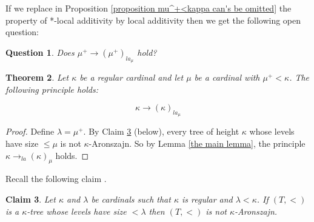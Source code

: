 \documentclass[11pt]{amsart}
\theoremstyle{plain}
\newtheorem{theorem}{Theorem}[section]
\newtheorem{claim}[theorem]{Claim}
\newtheorem{question}[theorem]{Question}
\theoremstyle{definition} %
\theoremstyle{remark}
\begin{document}
If we replace in Proposition \ref{proposition mu^+<kappa can's be omitted} the property of *-local additivity by local additivity then we get the following open question:
\begin{question}
Does $\mu^+ \rightarrow  (\mu^+)_{la_\mu}$ hold?
\end{question}


\begin{theorem}\label{the only theorem}
Let $\kappa$ be a regular cardinal and let $\mu$ be a cardinal with
 $\mu^+<\kappa$. The following principle holds:

 \[
 \kappa \rightarrow  (\kappa)_{la_\mu}
 \]


\end{theorem}

\begin{proof}
Define $\lambda=\mu^+$. By Claim \ref{the exercise of kunen} (below), every tree of height $\kappa$ whose levels have size $\leq \mu$ is not $\kappa$-Aronszajn. So by Lemma \ref{the main lemma}, the principle $\kappa \rightarrow_{la} (\kappa)_\mu$ holds.
\end{proof}


Recall the following claim \cite[Proposition 7.9]{Large}.
\begin{claim}\label{the exercise of kunen}
Let $\kappa$ and $\lambda$ be cardinals such that $\kappa$ is regular and $\lambda<\kappa$. If $(T,<)$ is
a $\kappa$-tree whose levels have size $<\lambda$ then $(T,<)$ is not $\kappa$-Aronszajn.
\end{claim}
\end{document}
